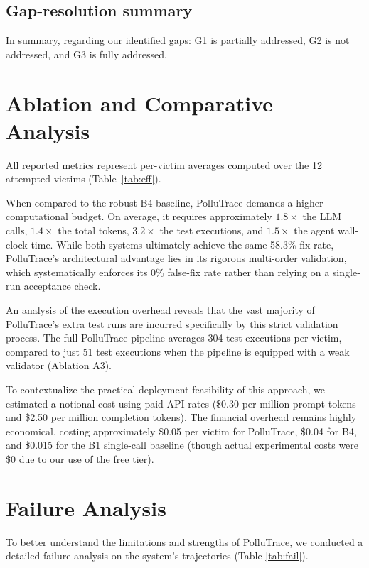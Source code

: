 \documentclass[conference]{IEEEtran}
\begin{document}
\subsection{Gap-resolution summary}

In summary, regarding our identified gaps: G1 is partially addressed, G2 is not addressed, and G3 is fully addressed.
\section{Ablation and Comparative Analysis}
\label{sec:ablation}

All reported metrics represent per-victim averages computed over the 12 attempted victims (Table~\ref{tab:eff}).

When compared to the robust B4 baseline, PolluTrace demands a higher computational budget. On average, it requires approximately $1.8\times$ the LLM calls, $1.4\times$ the total tokens, $3.2\times$ the test executions, and $1.5\times$ the agent wall-clock time. While both systems ultimately achieve the same 58.3\% fix rate, PolluTrace's architectural advantage lies in its rigorous multi-order validation, which systematically enforces its 0\% false-fix rate rather than relying on a single-run acceptance check.

An analysis of the execution overhead reveals that the vast majority of PolluTrace's extra test runs are incurred specifically by this strict validation process. The full PolluTrace pipeline averages 304 test executions per victim, compared to just 51 test executions when the pipeline is equipped with a weak validator (Ablation A3).

To contextualize the practical deployment feasibility of this approach, we estimated a notional cost using paid API rates (\$0.30 per million prompt tokens and \$2.50 per million completion tokens). The financial overhead remains highly economical, costing approximately \$0.05 per victim for PolluTrace, \$0.04 for B4, and \$0.015 for the B1 single-call baseline (though actual experimental costs were \$0 due to our use of the free tier).

\section{Failure Analysis}
\label{sec:failures}

To better understand the limitations and strengths of PolluTrace, we conducted a detailed failure analysis on the system's trajectories (Table \ref{tab:fail}).
\end{document}
